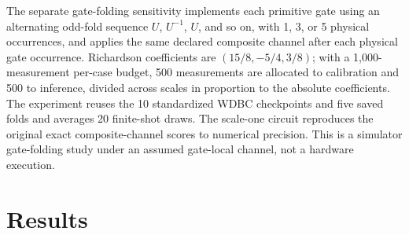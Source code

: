 \documentclass[conference]{IEEEtran}
\begin{document}
The separate gate-folding sensitivity implements each primitive gate using an alternating odd-fold sequence $U$, $U^{-1}$, $U$, and so on, with 1, 3, or 5 physical occurrences, and applies the same declared composite channel after each physical gate occurrence. Richardson coefficients are $(15/8,-5/4,3/8)$; with a 1,000-measurement per-case budget, 500 measurements are allocated to calibration and 500 to inference, divided across scales in proportion to the absolute coefficients. The experiment reuses the 10 standardized WDBC checkpoints and five saved folds and averages 20 finite-shot draws. The scale-one circuit reproduces the original exact composite-channel scores to numerical precision. This is a simulator gate-folding study under an assumed gate-local channel, not a hardware execution.

\section{Results}
\end{document}
